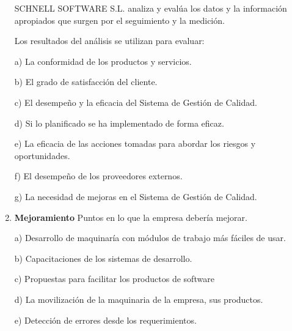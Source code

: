 \documentclass[10pt,a4paper]{article}
\begin{document}
\begin{enumerate}
SCHNELL SOFTWARE S.L. analiza y evalúa los datos y la información apropiados que surgen por el seguimiento y la
medición.

Los resultados del análisis se utilizan para evaluar:

a) La conformidad de los productos y servicios.

b) El grado de satisfacción del cliente.

c) El desempeño y la eficacia del Sistema de Gestión de Calidad.

d) Si lo planificado se ha implementado de forma eficaz.

e) La eficacia de las acciones tomadas para abordar los riesgos y oportunidades.

f) El desempeño de los proveedores externos.

g) La necesidad de mejoras en el Sistema de Gestión de Calidad.

\item \textbf{Mejoramiento}
Puntos en lo que la empresa debería mejorar.

a) Desarrollo de maquinaría con módulos de trabajo más fáciles de usar.

b) Capacitaciones de los sistemas de desarrollo.

c) Propuestas para facilitar los productos de software

d) La movilización de la maquinaria de la empresa, sus productos.

e) Detección de errores desde los requerimientos. 


\end{enumerate}
\end{document}
